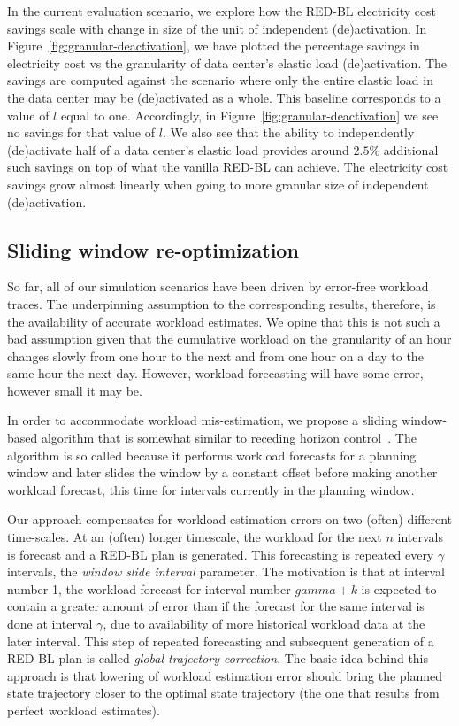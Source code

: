 In the current evaluation scenario, we explore how the RED-BL electricity cost savings scale with change in size of the unit of independent (de)activation. In Figure~\ref{fig:granular-deactivation}, we have plotted the percentage savings in electricity cost vs the granularity of data center's elastic load (de)activation. The savings are computed against the scenario where only the entire elastic load in the data center may be (de)activated as a whole. This baseline corresponds to a value of $l$ equal to one. Accordingly, in Figure~\ref{fig:granular-deactivation} we see no savings for that value of $l$. We also see that the ability to independently (de)activate half of a data center's elastic load provides around $2.5\%$ additional such savings on top of what the vanilla RED-BL can achieve. The electricity cost savings grow almost linearly when going to more granular size of independent (de)activation.

\subsection{Sliding window re-optimization}
So far, all of our simulation scenarios have been driven by error-free workload traces. The underpinning assumption to the corresponding results, therefore, is the availability of accurate workload estimates. We opine that this is not such a bad assumption given that the cumulative workload on the granularity of an hour changes slowly from one hour to the next and from one hour on a day to the same hour the next day. However, workload forecasting will have some error, however small it may be. 

In order to accommodate workload mis-estimation, we propose a sliding window-based algorithm that is somewhat similar to receding horizon control~\cite{rhc}. The algorithm is so called because it performs workload forecasts for a planning window and later slides the window by a constant offset before making another workload forecast, this time for intervals currently in the planning window. 

Our approach compensates for workload estimation errors on two (often) different time-scales. At an (often) longer timescale, the workload for the next $n$ intervals is forecast and a RED-BL plan is generated. This forecasting is repeated every $\gamma$ intervals, the \textit{window slide interval} parameter. The motivation is that at interval number 1, the workload forecast for interval number $gamma+k$ is expected to contain a greater amount of error than if the forecast for the same interval is done at interval $\gamma$, due to availability of more historical workload data at the later interval. This step of repeated forecasting and subsequent generation of a RED-BL plan is called \textit{global trajectory correction}. The basic idea behind this approach is that lowering of workload estimation error should bring the planned state trajectory closer to the optimal state trajectory (the one that results from perfect workload estimates). 

